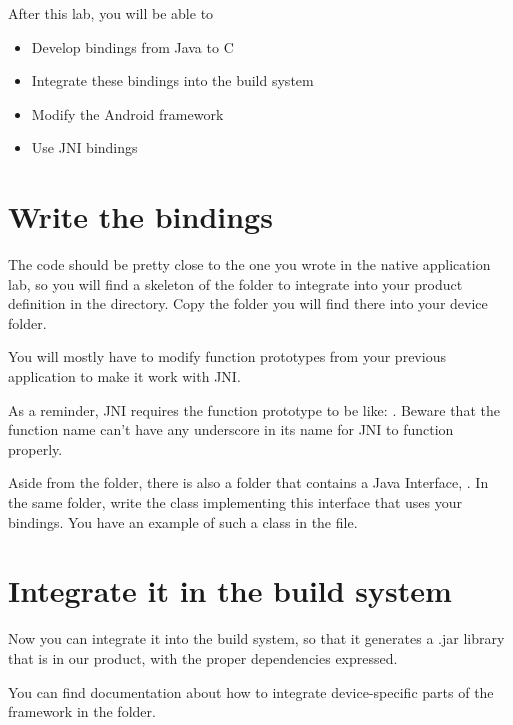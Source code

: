 
After this lab, you will be able to
\begin{itemize}
  \item Develop bindings from Java to C
  \item Integrate these bindings into the build system
  \item Modify the Android framework
  \item Use JNI bindings
\end{itemize}

\section{Write the bindings}

The code should be pretty close to the one you wrote in the native
application lab, so you will find a skeleton of the folder to
integrate into your product definition in the
 directory. Copy the 
folder you will find there into your device folder.

You will mostly have to modify function prototypes from your previous
application to make it work with JNI.

As a reminder, JNI requires the function prototype to be like:
.
Beware that the function name can't have any underscore in its name
for JNI to function properly.

Aside from the  folder, there is also a  folder that
contains a Java Interface, . In the same folder,
write the  class implementing this interface that uses your
bindings. You have an example of such a class in the 
file.

\section{Integrate it in the build system}

Now you can integrate it into the build system, so that it generates a .jar
library that is in our product, with the proper dependencies expressed.

You can find documentation about how to integrate device-specific parts of the
framework in the  folder.

